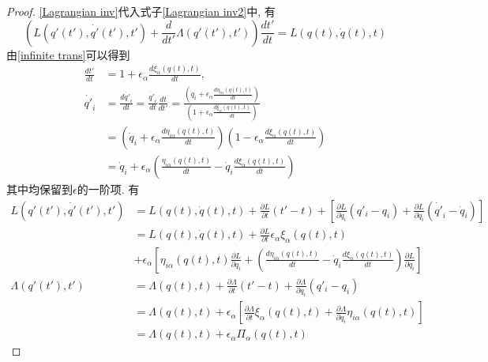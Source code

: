 \documentclass[a4paper,11pt]{article}
\newtheorem{proof}{证明}[section]
\begin{document}
\begin{proof}
  \eqref{Lagrangian inv}代入式子\eqref{Lagrangian inv2}中, 有
  \begin{equation}\label{coninv Lagrangian}
      \left(L(q'(t'),\dot{q'}(t'),t')+\frac{d}{dt'}\Lambda(q'(t'),t')\right)\frac{dt'}{dt}=L(q(t),\dot{q}(t),t)
  \end{equation}
  由\eqref{infinite trans}可以得到
  \begin{equation*}
    \begin{split}
       \frac{dt'}{dt}&=1+\epsilon_\alpha\frac{d\xi_\alpha(q(t),t)}{dt},\\
        \dot{q'}_i&=\frac{d\dot{q'}_i}{dt}=\frac{\dot{q'}_i}{dt}\frac{dt}{dt'}=\frac{\left(\dot{q}_i+\epsilon_\alpha\frac{d\eta_{i\alpha}(q(t),t)}{dt}\right)}{\left(1+\epsilon_\alpha\frac{d\xi_{\alpha}(q(t),t)}{dt}\right)}\\
         &=\left(\dot{q}_i+\epsilon_\alpha\frac{d\eta_{i\alpha}(q(t),t)}{dt}\right)\left(1-\epsilon_\alpha\frac{d\xi_{\alpha}(q(t),t)}{dt}\right)\\
         &=\dot{q}_i+\epsilon_\alpha\left(\frac{\eta_{i\alpha}(q(t),t)}{dt}-\dot{q}_i\frac{d\xi_{\alpha}(q(t),t)}{dt}\right)
    \end{split}
  \end{equation*}
  其中均保留到$\epsilon$的一阶项. 有
  \begin{equation*}
    \begin{split}
       L(q'(t'),\dot{q'}(t'),t')&=L(q(t),\dot{q}(t),t)+\frac{\partial L}{\partial t}(t'-t)+\left[\frac{\partial{L}}{\partial{\dot{q}_i}}(q'_i-q_i)+\frac{\partial L}{\partial{\dot{q}_i}}(\dot{q'}_i-\dot{q}_i)\right]\\
         & =L(q(t),\dot{q}(t),t)+\frac{\partial L}{\partial t}\epsilon_\alpha\xi_\alpha(q(t),t)\\
         & +\epsilon_\alpha\left[\eta_{i\alpha}(q(t),t)\frac{\partial L}{\partial {q_i}}+\left(\frac{d\eta_{i\alpha}(q(t),t)}{dt}-\dot{q}_i\frac{d\xi_\alpha(q(t),t)}{dt}\right)\frac{\partial L}{\partial \dot{q}_i}\right]\\
         \Lambda(q'(t'),t')&=\Lambda(q(t),t)+\frac{\partial \Lambda}{\partial t}(t'-t)+\frac{\partial \Lambda}{\partial{q_i}}(q'_i-q_i)\\
         &=\Lambda(q(t),t)+\epsilon_\alpha\left[\frac{\partial \Lambda}{\partial t}\xi_\alpha(q(t),t)+\frac{\partial \Lambda}{\partial q_i}\eta_{i\alpha}(q(t),t)\right]\\
         &=\Lambda(q(t),t)+\epsilon_\alpha\Pi_\alpha(q(t),t)
    \end{split}

\end{equation*}
\end{proof}
\end{document}
